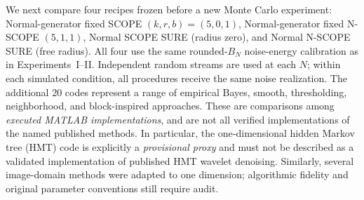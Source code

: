 We next compare four recipes frozen before a new Monte Carlo experiment:
Normal-generator fixed SCOPE $(k,r,b)=(5,0,1)$, Normal-generator
fixed N-SCOPE $(5,1,1)$, Normal SCOPE SURE (radius zero), and Normal
N-SCOPE SURE (free radius). All four use the same rounded-$B_N$ noise-energy calibration
as in Experiments~I--II. Independent random streams are used at each
$N$; within each simulated condition, all procedures receive the same
noise realization. The additional 20 codes represent a range of
empirical Bayes, smooth, thresholding, neighborhood, and block-inspired
approaches. These are comparisons among \emph{executed MATLAB
implementations}, and are not all verified implementations of the
named published methods. In particular, the one-dimensional hidden
Markov tree (HMT) code is explicitly a \emph{provisional proxy} and
must not be described as a validated implementation of published HMT
wavelet denoising. Similarly, several image-domain methods were
adapted to one dimension; algorithmic fidelity and original parameter
conventions still require audit.


